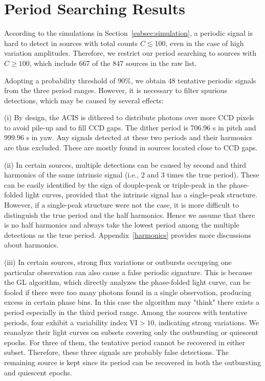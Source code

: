 \documentclass[fleqn,usenatbib]{mnras}
\begin{document}
\section{Period Searching Results}\label{sec:results}
According to the simulations in Section~\ref{subsec:simulation}, a periodic signal is hard to detect in sources with total counts $C\lesssim$100, even in the case of high variation amplitudes.  
Therefore, we restrict our period searching to sources with $C \geq 100$, which include 667 of the 847 sources in the raw list.

Adopting a probability threshold of 90\%, we obtain 48 tentative periodic signals from the three period ranges. However, it is necessary to filter spurious detections, which may be caused by several effects:

(i) By design, the ACIS is dithered to distribute photons over more CCD pixels to avoid pile-up and to fill CCD gaps.  The dither period is 706.96 s in pitch and 999.96 s in yaw. Any signals detected at these two periods and their harmonics are thus excluded. These are mostly found in sources located close to CCD gaps.

(ii) In certain sources, multiple detections can be caused by second and third harmonics of the same intrinsic signal (i.e., 2 and 3 times the true period). These can be easily identified by the sign of douple-peak or triple-peak in the phase-folded light curves, provided that the intrinsic signal has a single-peak structure. However, if a single-peak structure were not the case, it is more difficult to distinguish the true period and the half harmonics. Hence we assume that there is no half harmonics and always take the lowest period among the multiple detections as the true period. Appendix~\ref{harmonics} provides more discussions about harmonics.

(iii) In certain sources, strong flux variations or outbursts occupying one particular observation can also cause a false periodic signature. This is because the GL algorithm, which directly analyzes the phase-folded light curve, can be fooled if there were too many photons found in a single observation, producing excess in certain phase bins. In this case the algorithm may "think" there exists a period especially in the third period range. Among the sources with tentative periods, four exhibit a variability index VI$>10$, indicating strong variations. We reanalyze their light curves on subsets covering only the outbursting or quiescent epochs. For three of them, the tentative period cannot be recovered in either subset. Therefore, these three signals are probably false detections. The remaining source is kept since its period can be recovered in both the outbursting and quiescent epochs.
\end{document}
